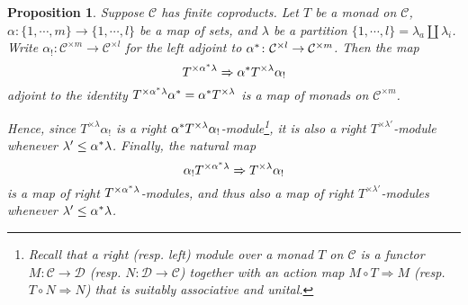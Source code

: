 \documentclass[a4paper,10pt
,draft
]{article}%
\numberwithin{equation}{section}
\numberwithin{figure}{section}
\newtheorem{proposition}[equation]{Proposition}%
\theoremstyle{definition} %
\newcommand{\C}{\ensuremath{\mathcal C}}
\newcommand{\1}{\ensuremath{\mathbbm 1}}%
\begin{document}
\begin{proposition}\label{MONADICFUN PROP}
	Suppose $\C$ has finite coproducts.
	Let $T$ be a monad on $\C$,
	$\alpha \colon \{1,\cdots,m\} \to \{1,\cdots,l\}$ be a map of sets,
	and $\lambda$ be a partition $\{1,\cdots,l\} = \lambda_a \amalg \lambda_i$.
	Write $\alpha_{!} \colon \mathcal{C}^{\times m} \to 
	\mathcal{C}^{\times l}$
	for the left adjoint to 
	$\alpha^{\**} \colon \mathcal{C}^{\times l} \to 
	\mathcal{C}^{\times m}$.
% 	 
	Then the map
\begin{equation}\label{MONADFUNCTORALPHA EQ}
	T^{\times \alpha^{\**} \lambda} \Rightarrow \alpha^{\**} T^{\times \lambda} \alpha_{!}
\end{equation}
adjoint to the identity 
$T^{\times \alpha^{\**}\lambda} \alpha^{\**} =
\alpha^{\**} T^{\times \lambda}$
is a map of monads on $\C^{\times m}$.

Hence, since $T^{\times \lambda} \alpha_!$ is a right 
$\alpha^{\**} T^{\times \lambda}\alpha_{!}$-module\footnote{
	Recall that a right (resp. left) module
	over a monad $T$ on $\mathcal{C}$
	is a functor $M \colon \mathcal{C} \to \mathcal{D}$
	(resp. $N \colon \mathcal{D} \to \mathcal{C}$)
	together with an action map $M \circ T \Rightarrow M$
	(resp. $T \circ N \Rightarrow N$)
	that is suitably associative and unital.}, 
it is also a right $T^{\times \lambda'}$-module
whenever
$\lambda' \leq \alpha^{\**} \lambda$.
Finally, the natural map 
\begin{equation}\label{MONADFUNCTORALPHADOU EQ}
	\alpha_{!} T^{\times \alpha^{\**} \lambda} \Rightarrow  T^{\times \lambda} \alpha_{!}
\end{equation}
is a map of right $T^{\times \alpha^{\**} \lambda}$-modules, 
and thus also a map of right 
$T^{\times \lambda'}$-modules
whenever $\lambda' \leq \alpha^{\**} \lambda$.
\end{proposition}

\end{document}
